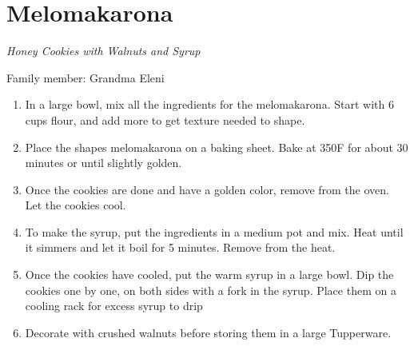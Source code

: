 \chapter{Melomakarona}
\label{ch:melomakarona}
\textit{Honey Cookies with Walnuts and Syrup}

Family member: Grandma Eleni


\begin{enumerate}
    \item In a large bowl, mix all the ingredients for the melomakarona. Start with 6 cups flour, and add more to get texture needed to shape.
    \item Place the shapes melomakarona on a baking sheet. Bake at 350\degree F for about 30 minutes or until slightly golden.
    \item Once the cookies are done and have a golden color, remove from the oven. Let the cookies cool. 
    \item To make the syrup, put the ingredients in a medium pot and mix. Heat until it simmers and let it boil for 5 minutes. Remove from the heat.
    \item Once the cookies have cooled, put the warm syrup in a large bowl. Dip the cookies one by one, on both sides with a fork in the syrup. Place them on a cooling rack for excess syrup to drip
    \item Decorate with crushed walnuts before storing them in a large Tupperware.
\end{enumerate}

